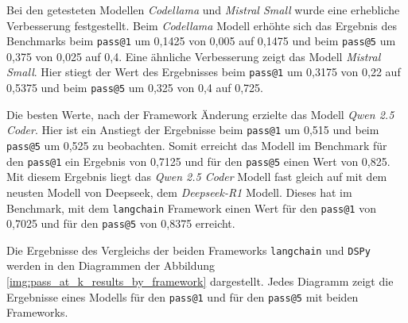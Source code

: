 Bei den getesteten Modellen \textit{Codellama} und \textit{Mistral Small} wurde eine erhebliche Verbesserung festgestellt. Beim \textit{Codellama} Modell erhöhte sich das Ergebnis des Benchmarks beim \texttt{pass@1} um 0,1425 von 0,005 auf 0,1475 und beim \texttt{pass@5} um 0,375 von 0,025 auf 0,4. Eine ähnliche Verbesserung zeigt das Modell \textit{Mistral Small}. Hier stiegt der Wert des Ergebnisses beim \texttt{pass@1} um 0,3175 von 0,22 auf 0,5375 und beim \texttt{pass@5} um 0,325 von 0,4 auf 0,725.\vspace{0.2cm}

Die besten Werte, nach der Framework Änderung erzielte das Modell \textit{Qwen 2.5 Coder}. Hier ist ein Anstiegt der Ergebnisse beim \texttt{pass@1} um 0,515 und beim \texttt{pass@5} um 0,525 zu beobachten. Somit erreicht das Modell im Benchmark für den \texttt{pass@1} ein Ergebnis von 0,7125 und für den \texttt{pass@5} einen Wert von 0,825. Mit diesem Ergebnis liegt das \textit{Qwen 2.5 Coder} Modell fast gleich auf mit dem neusten Modell von Deepseek, dem \textit{Deepseek-R1} Modell. Dieses hat im Benchmark, mit dem \texttt{langchain} Framework einen Wert für den \texttt{pass@1} von 0,7025 und für den \texttt{pass@5} von 0,8375 erreicht.\vspace{0.2cm}

Die Ergebnisse des Vergleichs der beiden Frameworks \texttt{langchain} und \texttt{DSPy} werden in den Diagrammen der Abbildung \ref{img:pass_at_k_results_by_framework} dargestellt. Jedes Diagramm zeigt die Ergebnisse eines Modells für den \texttt{pass@1} und für den \texttt{pass@5} mit beiden Frameworks.\vspace{0.2cm}

